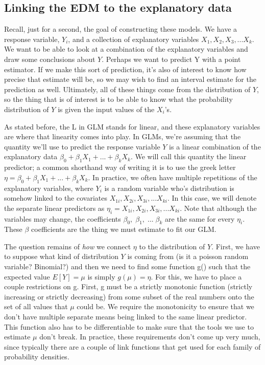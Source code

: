 \documentclass[
]{book}
\begin{document}
\hypertarget{linking-the-edm-to-the-explanatory-data}{%
\subsection{Linking the EDM to the explanatory data}\label{linking-the-edm-to-the-explanatory-data}}

Recall, just for a second, the goal of constructing these models. We have a response variable, \(Y_i\), and a collection of explanatory variables \(X_1, X_2, X_3,...X_k\). We want to be able to look at a combination of the explanatory variables and draw some conclusions about \(Y\). Perhaps we want to predict Y with a point estimator. If we make this sort of prediction, it's also of interest to know how precise that estimate will be, so we may wish to find an interval estimate for the prediction as well. Ultimately, all of these things come from the distribution of \(Y\), so the thing that is of interest is to be able to know what the probability distribution of \(Y\) is given the input values of the \(X_i\)'s.

As stated before, the L in GLM stands for linear, and these explanatory variables are where that linearity comes into play. In GLMs, we're assuming that the quantity we'll use to predict the response variable \(Y\) is a linear combination of the explanatory data \(\beta_0+\beta_1X_{1}+...+\beta_kX_{k}\). We will call this quantity the linear predictor; a common shorthand way of writing it is to use the greek letter \(\eta = \beta_0+\beta_1X_{1}+...+\beta_kX_{k}\). In practice, we often have multiple repetitions of the explanatory variables, where \(Y_i\) is a random variable who's distribution is somehow linked to the covariates \(X_{1i}, X_{2i}, X_{3i},...X_{ki}\). In this case, we will denote the separate linear predictors as \(\eta_i = X_{1i}, X_{2i}, X_{3i},...X_{ki}\). Note that although the variables may change, the coefficients \(\beta_0, \; \beta_1, \; ... \; \beta_k\) are the same for every \(\eta_i\). These \(\beta\) coefficients are the thing we must estimate to fit our GLM.

The question remains of \emph{how} we connect \(\eta\) to the distribution of \(Y\). First, we have to suppose what kind of distribution \(Y\) is coming from (is it a poisson random variable? Binomial?) and then we need to find some function g() such that the expected value \(E[Y] = \mu\) is simply \(g(\mu) = \eta\). For this, we have to place a couple restrictions on g. First, g must be a strictly monotonic function (strictly increasing or strictly decreasing) from some subset of the real numbers onto the set of all values that \(\mu\) could be. We require the monotonicity to ensure that we don't have multiple separate means being linked to the same linear predictor. This function also has to be differentiable to make sure that the tools we use to estimate \(\mu\) don't break. In practice, these requirements don't come up very much, since typically there are a couple of link functions that get used for each family of probability densities.
\end{document}
